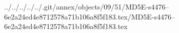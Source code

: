 ../../../../../.git/annex/objects/09/51/MD5E-s4476--6e2a24ed4e8712578a71b106a8f5f183.tex/MD5E-s4476--6e2a24ed4e8712578a71b106a8f5f183.tex